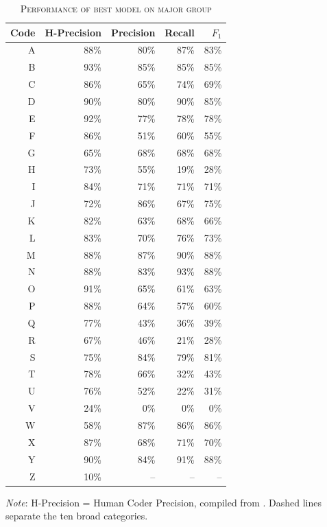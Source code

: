 \documentclass[11pt]{article}
\begin{document}
\begin{table}
\centering
\begin{threeparttable}
    \caption{\textsc{Performance of best model on major group}} \label{tab:perf_mg}
    \begin{tabular}{r|r|r|r|r}
		\hline
			Code & H-Precision & Precision & Recall & $F_1$ \\
		\hline
			A & 88\% & 80\% & 87\% & 83\% \\
			\hdashline
			B & 93\% & 85\% & 85\% & 85\% \\
			\hdashline
			C & 86\% & 65\% & 74\% & 69\% \\
			D & 90\% & 80\% & 90\% & 85\% \\
			\hdashline
			E & 92\% & 77\% & 78\% & 78\% \\
			F & 86\% & 51\% & 60\% & 55\% \\
			G & 65\% & 68\% & 68\% & 68\% \\
			H & 73\% & 55\% & 19\% & 28\% \\
			\hdashline
			I & 84\% & 71\% & 71\% & 71\% \\
			J & 72\% & 86\% & 67\% & 75\% \\
			K & 82\% & 63\% & 68\% & 66\% \\
			L & 83\% & 70\% & 76\% & 73\% \\
			M & 88\% & 87\% & 90\% & 88\% \\
			N & 88\% & 83\% & 93\% & 88\% \\
			O & 91\% & 65\% & 61\% & 63\% \\
			P & 88\% & 64\% & 57\% & 60\% \\
			\hdashline
			Q & 77\% & 43\% & 36\% & 39\% \\
			\hdashline
			R & 67\% & 46\% & 21\% & 28\% \\
			S & 75\% & 84\% & 79\% & 81\% \\
			T & 78\% & 66\% & 32\% & 43\% \\
			U & 76\% & 52\% & 22\% & 31\% \\
			V & 24\% & 0\% & 0\% & 0\% \\
			W & 58\% & 87\% & 86\% & 86\% \\
			\hdashline
			X & 87\% & 68\% & 71\% & 70\% \\
			\hdashline
			Y & 90\% & 84\% & 91\% & 88\% \\
			\hdashline
			Z & 10\% & -- & -- & -- \\
         \hline
    \end{tabular}
\begin{tablenotes}
\footnotesize
\item \emph{Note}: H-Precision = Human Coder Precision, compiled from \textcite[153]{StengelGettingItRight1998}. Dashed lines separate the ten broad categories.
\end{tablenotes}
\end{threeparttable}
\end{table}
\end{document}
